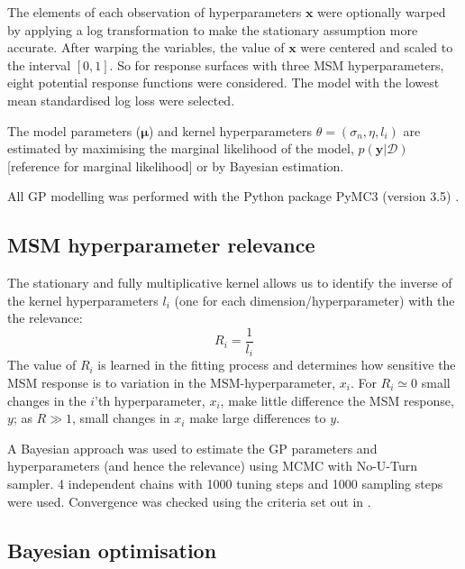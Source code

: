 \documentclass{article}
\begin{document}
The elements of each  observation of hyperparameters $\mathbf{x}$ were optionally warped by applying a log transformation to make the stationary assumption more accurate. After warping the variables, the value of $\mathbf{x}$ were centered and scaled to the interval $[0, 1]$. So for response surfaces with three MSM hyperparameters, eight potential response functions were considered. The model with the lowest mean standardised log loss were selected. 

The model parameters ($\bm{\mu}$) and kernel hyperparameters $\theta = (\sigma_n, \eta, l_{i})$ are estimated by maximising the marginal likelihood of the model, $p(\mathbf{y}|\mathcal{D})$ [reference for marginal likelihood] or by Bayesian estimation. 




All GP modelling was performed with the Python package PyMC3 (version 3.5) \cite{salvatierProbabilisticProgrammingPython2016}.

 \subsection{MSM hyperparameter relevance}
 
The stationary and fully multiplicative kernel allows us to identify the inverse of the kernel hyperparameters $l_{i}$ (one for each dimension/hyperparameter) with the the relevance:
\begin{equation}
    R_{i} = \frac{1}{l_{i}}
\end{equation}
The value of $R_{i}$ is learned in the fitting process and determines how sensitive the MSM response is to variation in the MSM-hyperparameter, $x_{i}$. For $R_{i} \simeq 0$ small changes in the $i$'th hyperparameter,  $x_{i}$, make little difference the MSM response, $y$; as $R \gg 1$, small changes in $x_{i}$ make large differences to $y$. 

A Bayesian approach was used to estimate the GP parameters and hyperparameters (and hence the relevance) using MCMC with No-U-Turn sampler.  4 independent chains with 1000 tuning steps and 1000 sampling steps were used. Convergence was checked using the criteria set out in \cite{vehtariRanknormalizationFoldingLocalization2020}.  

\subsection{Bayesian optimisation}
\end{document}
